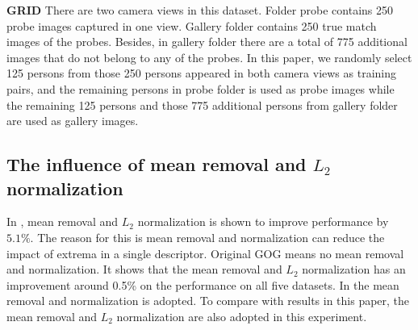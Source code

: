 \documentclass[conference,compsoc]{IEEEtran}
\begin{document}
\textbf{GRID} There are two camera views in this dataset. Folder probe contains 250 probe images captured in one view. Gallery folder contains 250 true match images of the probes. Besides, in gallery folder there are a total of 775 additional images that do not belong to any of the probes. In this paper, we randomly select 125 persons from those 250 persons appeared in both camera views as training pairs, and the remaining persons in probe folder is used as probe images while  the remaining 125 persons and those 775 additional persons from gallery folder are used as gallery images. 
\subsection{The influence of mean removal and $L_2$ normalization}
In \cite{GOG}, mean removal and $L_2$  normalization is shown to improve performance by $5.1\%$. The reason for this is mean removal and normalization can reduce the impact of extrema in a single descriptor. 
Original GOG means no mean removal and normalization. It shows that the mean removal and $L_2$ normalization has an improvement around 0.5\% on the performance on all five datasets. In \cite{GOG} the mean removal and normalization is adopted. To compare with results in this paper, the mean removal and $L_2$ normalization are also adopted in this experiment. 
\end{document}
